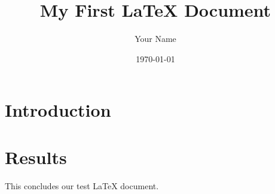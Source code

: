 \documentclass{article}
\begin{document}
\title{My First LaTeX Document}
\author{Your Name}
\date{\today}
\maketitle

\section{Introduction}




\section{Results}




This concludes our test LaTeX document.
\end{document}
